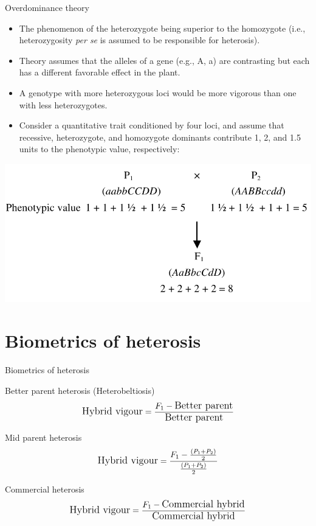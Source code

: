 \documentclass[11pt,ignorenonframetext,aspectratio=169]{beamer}
\providecommand{\tightlist}{%
  \setlength{\itemsep}{0pt}\setlength{\parskip}{0pt}}
\begin{document}
\begin{frame}{Overdominance theory}
\protect\hypertarget{overdominance-theory}{}
\small

\begin{itemize}
\tightlist
\item
  The phenomenon of the heterozygote being superior to the homozygote
  (i.e., heterozygosity \emph{per se} is assumed to be responsible for
  heterosis).
\item
  Theory assumes that the alleles of a gene (e.g., A, a) are contrasting
  but each has a different favorable effect in the plant.
\item
  A genotype with more heterozygous loci would be more vigorous than one
  with less heterozygotes.
\item
  Consider a quantitative trait conditioned by four loci, and assume
  that recessive, heterozygote, and homozygote dominants contribute 1,
  2, and 1.5 units to the phenotypic value, respectively:
\end{itemize}

\begin{center}\includegraphics[width=0.5\linewidth]{./images/overdominance_theory} \end{center}
\end{frame}

\hypertarget{biometrics-of-heterosis}{%
\section{Biometrics of heterosis}\label{biometrics-of-heterosis}}

\begin{frame}{Biometrics of heterosis}
\begin{block}{Better parent heterosis (Heterobeltiosis)}
\protect\hypertarget{better-parent-heterosis-heterobeltiosis}{}
\[\large \text{Hybrid vigour} = \frac{F_1-\text{Better parent}}{\text{Better parent}}\]
\end{block}

\begin{block}{Mid parent heterosis}
\protect\hypertarget{mid-parent-heterosis}{}
\[\large \text{Hybrid vigour} = \frac{F_1-\frac{(P_1+P_2)}{2}}{\frac{(P_1+P_2)}{2}}\]
\end{block}

\begin{block}{Commercial heterosis}
\protect\hypertarget{commercial-heterosis}{}
\[\large \text{Hybrid vigour} = \frac{F_1-\text{Commercial hybrid}}{\text{Commercial hybrid}}\]
\end{block}
\end{frame}
\end{document}
